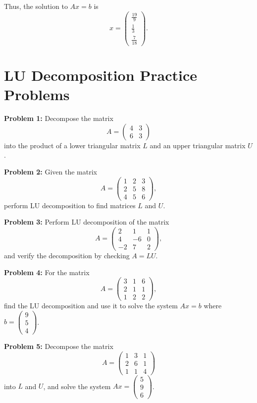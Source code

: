 \documentclass[
  letterpaper,
  DIV=11,
  numbers=noendperiod]{scrreprt}
\theoremstyle{plain}
\theoremstyle{definition}
\theoremstyle{remark}
\begin{document}
Thus, the solution to \(Ax = b\) is
\[ x = \begin{pmatrix} \frac{19}{9} \\ \frac{1}{3} \\ \frac{7}{18} \end{pmatrix}. \]

\section{LU Decomposition Practice
Problems}\label{lu-decomposition-practice-problems}

\textbf{Problem 1:} Decompose the matrix
\[ A = \begin{pmatrix} 4 & 3 \\ 6 & 3 \end{pmatrix} \] into the product
of a lower triangular matrix \(L\) and an upper triangular matrix \(U\).

\textbf{Problem 2:} Given the matrix
\[ A = \begin{pmatrix} 1 & 2 & 3 \\ 2 & 5 & 8 \\ 4 & 5 & 6 \end{pmatrix}, \]
perform LU decomposition to find matrices \(L\) and \(U\).

\textbf{Problem 3:} Perform LU decomposition of the matrix
\[ A = \begin{pmatrix} 2 & 1 & 1 \\ 4 & -6 & 0 \\ -2 & 7 & 2 \end{pmatrix}, \]
and verify the decomposition by checking \(A = LU\).

\textbf{Problem 4:} For the matrix
\[ A = \begin{pmatrix} 3 & 1 & 6 \\ 2 & 1 & 1 \\ 1 & 2 & 2 \end{pmatrix}, \]
find the LU decomposition and use it to solve the system \(Ax = b\)
where \(b = \begin{pmatrix} 9 \\ 5 \\ 4 \end{pmatrix}\).

\textbf{Problem 5:} Decompose the matrix
\[ A = \begin{pmatrix} 1 & 3 & 1 \\ 2 & 6 & 1 \\ 1 & 1 & 4 \end{pmatrix} \]
into \(L\) and \(U\), and solve the system
\(Ax = \begin{pmatrix} 5 \\ 9 \\ 6 \end{pmatrix}\).
\end{document}
